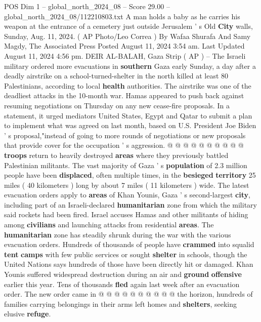 \begin{textsample}{POS Dim 1 – global\_north\_2024\_08 – Score 29.00 – global\_north\_2024\_08/112210803.txt}  \label{ex:f1_pos_408}
A man holds a baby as he carries his weapon at the entrance of a cemetery just outside Jerusalem ' s Old \textbf{City} walls, Sunday, Aug. 11, 2024. ( AP Photo/Leo Correa ) By Wafaa Shurafa And Samy Magdy, The Associated Press Posted August 11, 2024 3:54 am.
Last Updated August 11, 2024 4:56 pm.
DEIR AL-BALAH, Gaza Strip ( AP ) -- The Israeli military ordered more evacuations in \textbf{southern} Gaza early Sunday, a day after a deadly airstrike on a school-turned-shelter in the north killed at least 80 Palestinians, according to local \textbf{health} authorities.
The airstrike was one of the deadliest attacks in the 10-month war.
Hamas appeared to push back against resuming negotiations on Thursday on any new cease-fire proposals.
In a statement, it urged mediators United States, Egypt and Qatar to submit a plan to implement what was agreed on last month, based on U.S.
President Joe Biden ' s proposal,"instead of going to more rounds of negotiations or new proposals that provide cover for the occupation ' s aggression. @ @ @ @ @ @ @ @ @ @ \textbf{troops} return to heavily destroyed \textbf{areas} where they previously battled Palestinian militants.
The vast majority of Gaza ' s \textbf{population} of 2.3 million people have been \textbf{displaced}, often multiple times, in the \textbf{besieged} \textbf{territory} 25 miles ( 40 kilometers ) long by about 7 miles ( 11 kilometers ) wide.
The latest evacuation orders apply to \textbf{areas} of Khan Younis, Gaza ' s second-largest \textbf{city}, including part of an Israeli-declared \textbf{humanitarian} zone from which the military said rockets had been fired.
Israel accuses Hamas and other militants of hiding among \textbf{civilians} and launching attacks from residential \textbf{areas}.
The \textbf{humanitarian} zone has steadily shrunk during the war with the various evacuation orders.
Hundreds of thousands of people have \textbf{crammed} into squalid \textbf{tent} \textbf{camps} with few public services or sought \textbf{shelter} in schools, though the United Nations says hundreds of those have been directly hit or damaged.
Khan Younis suffered widespread destruction during an air and \textbf{ground} \textbf{offensive} earlier this year.
Tens of thousands \textbf{fled} again last week after an evacuation order.
The new order came in @ @ @ @ @ @ @ @ @ @ the horizon, hundreds of families carrying belongings in their arms left homes and \textbf{shelters}, seeking elusive \textbf{refuge}.

\end{textsample}
